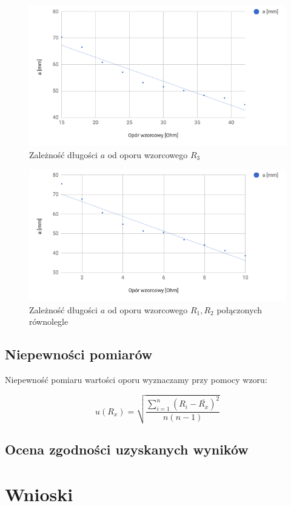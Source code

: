 \documentclass[a4paper,10pt,twoside]{article}
\begin{document}
\begin{figure}[!htp]
\centerline{\includegraphics[scale=0.5]{wykres_r3.png}}
\caption{Zależność długości $a$ od oporu wzorcowego $R_3$}
\label{fig:wykres_r3}
\end{figure}

\begin{figure}[!htp]
\centerline{\includegraphics[scale=0.5]{wykres_r1_r2_par.png}}
\caption{Zależność długości $a$ od oporu wzorcowego $R_1, R_2$ połączonych równolegle}
\label{fig:wykres_r1_r2_par}
\end{figure}


\subsection{Niepewności pomiarów}

Niepewność pomiaru wartości oporu wyznaczamy przy pomocy wzoru:

$$ u(R_x) = \sqrt{\frac{\sum^n_{i=1}\left(R_i - \overline{R_x} \right)^2}{n(n-1)}} $$

\subsection{Ocena zgodności uzyskanych wyników}

\section{Wnioski}
\end{document}
